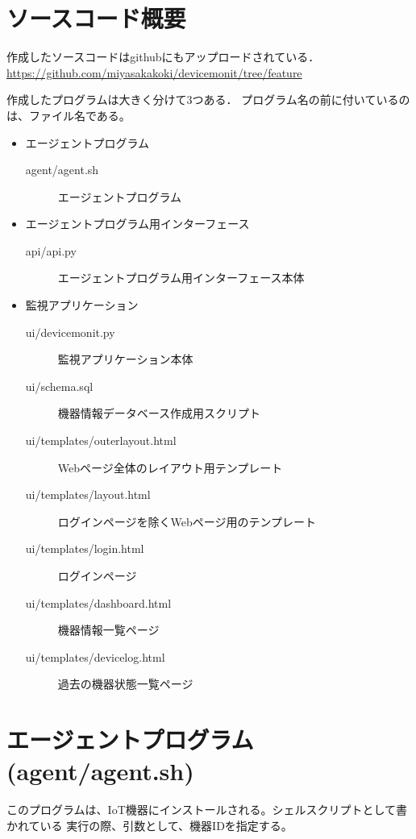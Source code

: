 \section*{ソースコード概要}
作成したソースコードはgithubにもアップロードされている．
\url{https://github.com/miyasakakoki/devicemonit/tree/feature}

作成したプログラムは大きく分けて3つある．
プログラム名の前に付いているのは、ファイル名である。
\begin{itemize}
\item エージェントプログラム\\
	\begin{description}
		\item[agent/agent.sh] エージェントプログラム
	\end{description}
\item エージェントプログラム用インターフェース\\
	\begin{description}
		\item[api/api.py] エージェントプログラム用インターフェース本体
	\end{description}
\item 監視アプリケーション\\
	\begin{description}
		\item[ui/devicemonit.py] 監視アプリケーション本体
		\item[ui/schema.sql] 機器情報データベース作成用スクリプト
		\item[ui/templates/outerlayout.html] Webページ全体のレイアウト用テンプレート
		\item[ui/templates/layout.html] ログインページを除くWebページ用のテンプレート
		\item[ui/templates/login.html] ログインページ
		\item[ui/templates/dashboard.html] 機器情報一覧ページ
		\item[ui/templates/devicelog.html] 過去の機器状態一覧ページ
	\end{description}
\end{itemize}


\section*{エージェントプログラム(agent/agent.sh)}
このプログラムは、IoT機器にインストールされる。シェルスクリプトとして書かれている
実行の際、引数として、機器IDを指定する。


